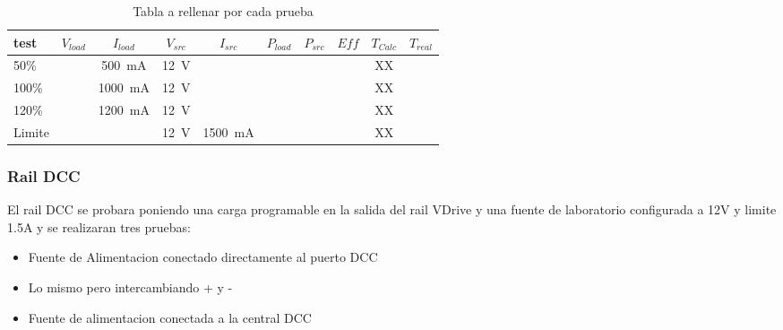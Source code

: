 \begin{table}[H]
    \centering
    \renewcommand\theadfont{\bfseries}
    \setlength{\tabcolsep}{10pt}
    \renewcommand{\arraystretch}{1.5}
    \begin{tabular}{|l|c|c|c|c|c|c|c|c|c|}
        \hline
        test   & $V_{load}$ & $I_{load}$               & $V_{src}$      & $I_{src}$                & $P_{load}$ & $P_{src}$ & $Eff$ & $T_{Calc}$ & $T_{real}$ \\ \hline
        50\%   &            & \SI{500}{\milli\ampere}  & \SI{12}{\volt} &                          &            &           &       & XX         &            \\ \hline

        100\%  &            & \SI{1000}{\milli\ampere} & \SI{12}{\volt} &                          &            &           &       & XX         &            \\ \hline

        120\%  &            & \SI{1200}{\milli\ampere} & \SI{12}{\volt} &                          &            &           &       & XX         &            \\ \hline

        Limite &            &                          & \SI{12}{\volt} & \SI{1500}{\milli\ampere} &            &           &       & XX         &            \\

        \hline
    \end{tabular}

    \caption{Tabla a rellenar por cada prueba}
    \label{tab:exampleDataLab}
\end{table}


\subsubsection{Rail DCC}
El rail DCC se probara poniendo una carga programable en la salida del rail VDrive y una
fuente de laboratorio configurada a 12V y limite 1.5A y se realizaran tres pruebas:

\begin{itemize}
    \item Fuente de Alimentacion conectado directamente al puerto DCC
    \item Lo mismo pero intercambiando + y -
    \item Fuente de alimentacion conectada a la central DCC
\end{itemize}


